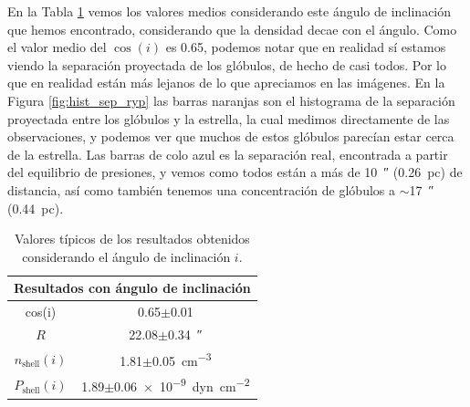 \documentclass{book}
\begin{document}
En la Tabla \ref{tab:mean_i} vemos los valores medios considerando
este ángulo de inclinación que hemos encontrado, considerando que la
densidad decae con el ángulo. Como el valor medio del $\cos(i)$ es
0.65, podemos notar que en realidad sí estamos viendo la separación
proyectada de los glóbulos, de hecho de casi todos. Por lo que en
realidad están más lejanos de lo que apreciamos en las imágenes. En la
Figura \ref{fig:hist_sep_ryp} las barras naranjas son el histograma de
la separación proyectada entre los glóbulos y la estrella, la cual
medimos directamente de las observaciones, y podemos ver que muchos de
estos glóbulos parecían estar cerca de la estrella. Las barras de colo
azul es la separación real, encontrada a partir del equilibrio de
presiones, y vemos como todos están a más de \SI{10}{\arcsecond}
(\SI{0.26}{pc}) de distancia, así como también tenemos una
concentración de glóbulos a $\sim$\SI{17}{\arcsecond} (\SI{0.44}{pc}).

\begin{table}[htb]
    \centering
    \begin{tabular}{c c}
        \toprule
        \multicolumn{2}{c}{Resultados con ángulo de inclinación} \\ \midrule
         cos(i) & 0.65$\pm$0.01 \\
         $R$ & 22.08$\pm$\SI{0.34}{\arcsecond}\\
         $n_\mathrm{shell}(i)$ & 1.81$\pm$\SI{0.05}{cm^{-3}}\\
         $P_\mathrm{shell}(i)$ & 1.89$\pm$\SI{0.06e-9}{dyn.cm^{-2}} \\
         \bottomrule
    \end{tabular}
    \caption{Valores típicos de los resultados obtenidos considerando
      el ángulo de inclinación $i$.}
    \label{tab:mean_i}
\end{table}
\end{document}
